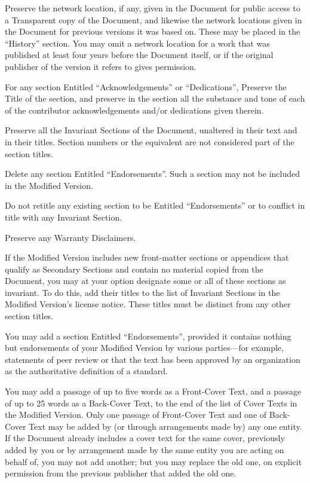 \begin{itemize*}
\item[J.]
   Preserve the network location, if any, given in the Document for
   public access to a Transparent copy of the Document, and likewise
   the network locations given in the Document for previous versions
   it was based on.  These may be placed in the ``History'' section.
   You may omit a network location for a work that was published at
   least four years before the Document itself, or if the original
   publisher of the version it refers to gives permission.
   
\item[K.]
   For any section Entitled ``Acknowledgements'' or ``Dedications'',
   Preserve the Title of the section, and preserve in the section all
   the substance and tone of each of the contributor acknowledgements
   and/or dedications given therein.
   
\item[L.]
   Preserve all the Invariant Sections of the Document,
   unaltered in their text and in their titles.  Section numbers
   or the equivalent are not considered part of the section titles.
   
\item[M.]
   Delete any section Entitled ``Endorsements''.  Such a section
   may not be included in the Modified Version.
   
\item[N.]
   Do not retitle any existing section to be Entitled ``Endorsements''
   or to conflict in title with any Invariant Section.
   
\item[O.]
   Preserve any Warranty Disclaimers.
\end{itemize*}

If the Modified Version includes new front-matter sections or
appendices that qualify as Secondary Sections and contain no material
copied from the Document, you may at your option designate some or all
of these sections as invariant.  To do this, add their titles to the
list of Invariant Sections in the Modified Version's license notice.
These titles must be distinct from any other section titles.

You may add a section Entitled ``Endorsements'', provided it contains
nothing but endorsements of your Modified Version by various
parties---for example, statements of peer review or that the text has
been approved by an organization as the authoritative definition of a
standard.

You may add a passage of up to five words as a Front-Cover Text, and a
passage of up to 25 words as a Back-Cover Text, to the end of the list
of Cover Texts in the Modified Version.  Only one passage of
Front-Cover Text and one of Back-Cover Text may be added by (or
through arrangements made by) any one entity.  If the Document already
includes a cover text for the same cover, previously added by you or
by arrangement made by the same entity you are acting on behalf of,
you may not add another; but you may replace the old one, on explicit
permission from the previous publisher that added the old one.

